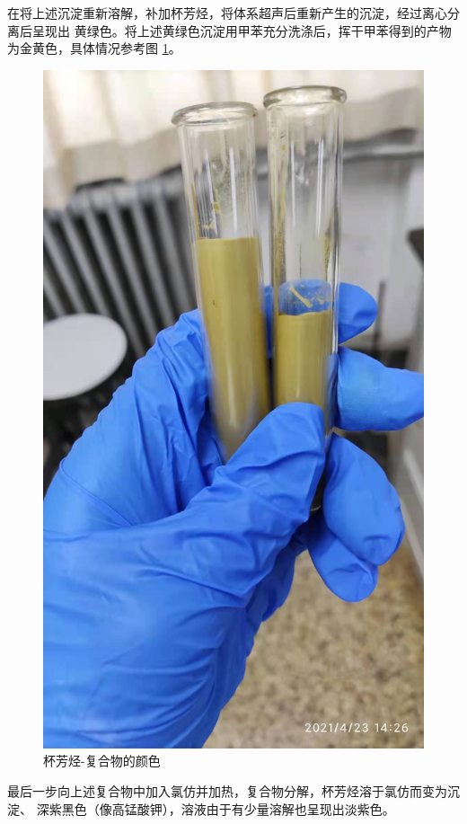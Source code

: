 \documentclass[a4paper,zihao=5,UTF8]{ctexart}
\begin{document}
    \par 
    在将上述沉淀重新溶解，补加杯芳烃，将体系超声后重新产生的沉淀，经过离心分离后呈现出
    黄绿色。将上述黄绿色沉淀用甲苯充分洗涤后，挥干甲苯得到的产物为金黄色，具体情况参考图
    \ref{color2}。
    \begin{figure}
        \centering
        \includegraphics[scale=0.15]{color2.jpg}
        \caption{杯芳烃-复合物的颜色}
        \label{color2}
    \end{figure}
    \par 
    最后一步向上述复合物中加入氯仿并加热，复合物分解，杯芳烃溶于氯仿而变为沉淀、
    深紫黑色（像高锰酸钾），溶液由于有少量溶解也呈现出淡紫色。
\end{document}
